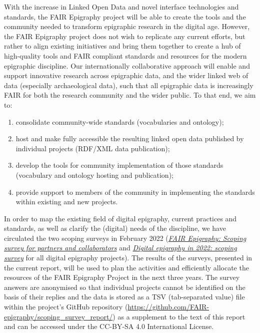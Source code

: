 \documentclass[
  10pt,
]{article}
\providecommand{\tightlist}{%
  \setlength{\itemsep}{0pt}\setlength{\parskip}{0pt}}
\begin{document}
With the increase in Linked Open Data and novel interface technologies
and standards, the FAIR Epigraphy project will be able to create the
tools and the community needed to transform epigraphic research in the
digital age. However, the FAIR Epigraphy project does not wish to
replicate any current efforts, but rather to align existing initiatives
and bring them together to create a hub of high-quality tools and FAIR
compliant standards and resources for the modern epigraphic discipline.
Our internationally collaborative approach will enable and support
innovative research across epigraphic data, and the wider linked web of
data (especially archaeological data), such that all epigraphic data is
increasingly FAIR for both the research community and the wider public.
To that end, we aim to:

\begin{enumerate}
\def\labelenumi{\arabic{enumi}.}
\tightlist
\item
  consolidate community-wide standards (vocabularies and ontology);
\item
  host and make fully accessible the resulting linked open data
  published by individual projects (RDF/XML data publication);
\item
  develop the tools for community implementation of those standards
  (vocabulary and ontology hosting and publication);
\item
  provide support to members of the community in implementing the
  standards within existing and new projects.
\end{enumerate}

In order to map the existing field of digital epigraphy, current
practices and standards, as well as clarify the (digital) needs of the
discipline, we have circulated the two scoping surveys in February 2022
(\href{https://github.com/FAIR-epigraphy/scoping_survey_report/data/01_Survey_partners_questions.pdf}{\emph{FAIR
Epigraphy: Scoping survey for partners and collaborators}} and
\href{https://github.com/FAIR-epigraphy/scoping_survey_report/data/02_Survey_projects_questions.pdf}{\emph{Digital
epigraphy in 2022: scoping survey}} for all digital epigraphy projects).
The results of the surveys, presented in the current report, will be
used to plan the activities and efficiently allocate the resources of
the FAIR Epigraphy Project in the next three years. The survey answers
are anonymised so that individual projects cannot be identified on the
basis of their replies and the data is stored as a TSV (tab-separated
value) file within the project's GitHub repository
(\url{https://github.com/FAIR-epigraphy/scoping_survey_report/}) as a
supplement to the text of this report and can be accessed under the
CC-BY-SA 4.0 International License.
\end{document}
